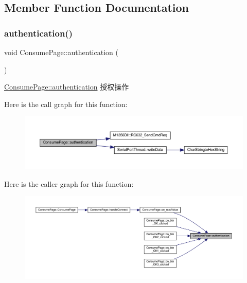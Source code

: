 \subsection{Member Function Documentation}
\mbox{\label{class_consume_page_a26ad9f5afc48a91b04f6ba99f524dc44}} 
\subsubsection{\texorpdfstring{authentication()}{authentication()}}
{\footnotesize\ttfamily void Consume\+Page\+::authentication (\begin{DoxyParamCaption}{ }\end{DoxyParamCaption})}



\mbox{\hyperlink{class_consume_page_a26ad9f5afc48a91b04f6ba99f524dc44}{Consume\+Page\+::authentication}} 授权操作 

Here is the call graph for this function\+:
\nopagebreak
\begin{figure}[H]
\begin{center}
\leavevmode
\includegraphics[width=350pt]{class_consume_page_a26ad9f5afc48a91b04f6ba99f524dc44_cgraph}
\end{center}
\end{figure}
Here is the caller graph for this function\+:
\nopagebreak
\begin{figure}[H]
\begin{center}
\leavevmode
\includegraphics[width=350pt]{class_consume_page_a26ad9f5afc48a91b04f6ba99f524dc44_icgraph}
\end{center}
\end{figure}
\mbox{\label{class_consume_page_ac51abb2cb079fc3884f4999d6467ad1b}} 

